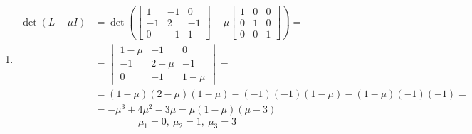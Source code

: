 \begin{enumerate}[label=\Roman*)]
\item \begin{align*}
\det (L-\mu I)&= \det \left(\begin{bmatrix}
1&-1&0\\-1&2&-1\\0&-1&1
\end{bmatrix}-\mu \begin{bmatrix}
1&0&0\\0&1&0\\0&0&1
\end{bmatrix}\right)=\\
&=\begin{vmatrix}
1-\mu &-1    &0\\
-1    &2-\mu &-1\\
0     &-1    &1-\mu
\end{vmatrix} =\\ 
&= (1-\mu )(2-\mu)(1-\mu )-(-1)(-1)(1-\mu )-(1-\mu )(-1)(-1)=\\
&=-\mu ^3+4\mu ^2-3\mu =\mu (1-\mu )(\mu -3)
\end{align*}
$$\mu_1 = 0,\ \mu _2 = 1,\ \mu _3 = 3$$
\end{enumerate}

